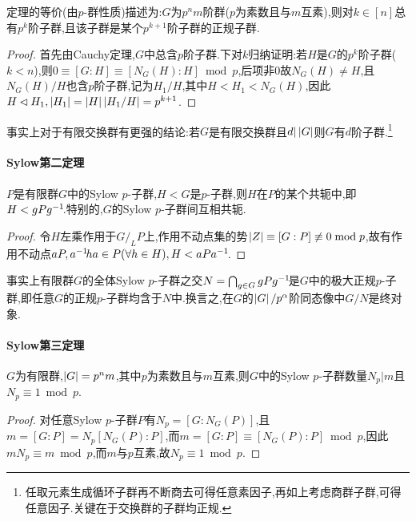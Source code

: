 \documentclass[11pt]{article} %
\begin{document}
定理的等价(由$p$-群性质)描述为:$G$为$p^nm$阶群($p$为素数且与$m$互素),则对$k\in [n]$总有$p^k$阶子群,且该子群是某个$p^{k+1}$阶子群的正规子群.

\begin{proof}
    首先由Cauchy定理,$G$中总含$p$阶子群.下对$k$归纳证明:若$H$是$G$的$p^k$阶子群($k<n$),则$0\equiv [G:H]\equiv [N_G(H):H]\bmod p$,后项非0故$N_G(H)\neq H$,且$N_G(H)/H$也含$p$阶子群,记为$H_1/H$,其中$H<H_1<N_G(H)$,因此$H\lhd H_1, \left|H_1\right|=\left|H\right|\left|H_1/H\right|=p^{k+1}$.
\end{proof}

事实上对于有限交换群有更强的结论:若$G$是有限交换群且$d|\left|G\right|$则$G$有$d$阶子群.\footnote{任取元素生成循环子群再不断商去可得任意素因子,再如上考虑商群子群,可得任意因子.关键在于交换群的子群均正规.}

\paragraph{Sylow第二定理}
$P$是有限群$G$中的Sylow $p$-子群,$H<G$是$p$-子群,则$H$在$P$的某个共轭中,即$H<gPg^{-1}\!$.特别的,$G$的Sylow $p$-子群间互相共轭.
\begin{proof}
    令$H$左乘作用于$G/_LP$上,作用不动点集的势$\left|Z\right|\equiv [G:P]\not\equiv 0\bmod p$,故有作用不动点$aP, a^{-1}\! ha\in P(\forall h\in H), H<aPa^{-1}\!$.
\end{proof}

事实上有限群$G$的全体Sylow $p$-子群之交$N=\bigcap_{g\in G}gPg^{-1}\!$是$G$中的极大正规$p$-子群,即任意$G$的正规$p$-子群均含于$N$中.换言之,在$G$的$\left|G\right|/p^\alpha$阶同态像中$G/N$是终对象.

\paragraph{Sylow第三定理}
$G$为有限群,$\left|G\right|=p^nm$,其中$p$为素数且与$m$互素,则$G$中的Sylow $p$-子群数量$N_p|m$且$N_p\equiv 1\bmod p$.
\begin{proof}
    对任意Sylow $p$-子群$P$有$N_p=[G:N_G(P)]$,且$m=[G:P]=N_p[N_G(P):P]$,而$m=[G:P]\equiv [N_G(P):P]\bmod p$,因此$mN_p\equiv m\bmod p$,而$m$与$p$互素,故$N_p\equiv 1\bmod p$.
\end{proof}
\end{document}

